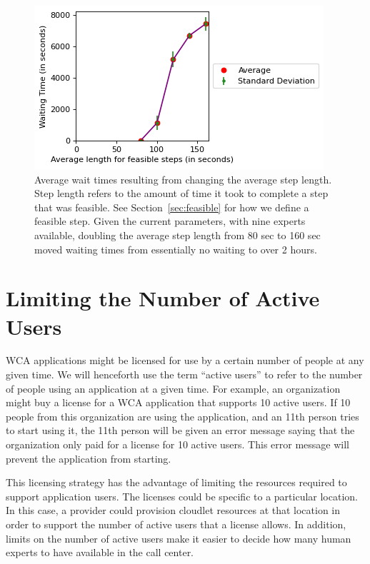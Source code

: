 \begin{figure}[H]
  \includegraphics{figures/montecarlo/vary_step_length.png}
  \caption[Average wait times resulting from changing the average step length]{
    Average wait times resulting from changing the average step length.
    Step length refers to the amount of time it took to complete a step that was
    feasible.
    See Section~\ref{sec:feasible} for how we define a feasible step.
    Given the current parameters, with nine experts available, doubling the
    average
    step length from 80 sec to 160 sec moved waiting times from essentially no
    waiting to over 2 hours.
  }\label{fig:vary_step_length}
\end{figure}

\section{Limiting the Number of Active Users}

WCA applications might be licensed for use by a certain number of people at
any given time.
We will henceforth use the term ``active users'' to refer to the number of
people using an application at a given time.
For example, an organization might buy a license for a WCA application that
supports 10 active users.
If 10 people from this organization are using the application, and an 11th
person tries to start using it, the 11th person will be given an error message
saying that the organization only paid for a license for 10 active users.
This error message will prevent the application from starting.

This licensing strategy has the advantage of limiting the resources required to
support application users.
The licenses could be specific to a particular location.
In this case, a provider could provision cloudlet resources at that location in
order to support the number of active users that a license allows.
In addition, limits on the number of active users make it easier to decide how
many human experts to have available in the call center.

